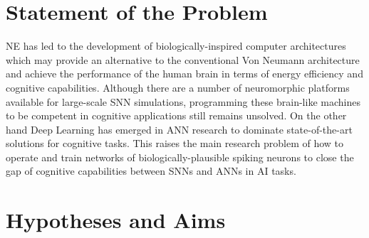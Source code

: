 \section{Statement of the Problem}
\label{sec:state_problem}
NE has led to the development of biologically-inspired computer architectures which may provide an alternative to the conventional Von Neumann architecture and achieve the performance of the human brain in terms of energy efficiency and cognitive capabilities.
Although there are a number of neuromorphic platforms available for large-scale SNN simulations, programming these brain-like machines to be competent in cognitive applications still remains unsolved.
On the other hand Deep Learning has emerged in ANN research to dominate state-of-the-art solutions for cognitive tasks.
This raises the main research problem of how to operate and train networks of biologically-plausible spiking neurons to close the gap of cognitive capabilities between SNNs and ANNs in AI tasks.



\section{Hypotheses and Aims}
\label{sec:aim}


